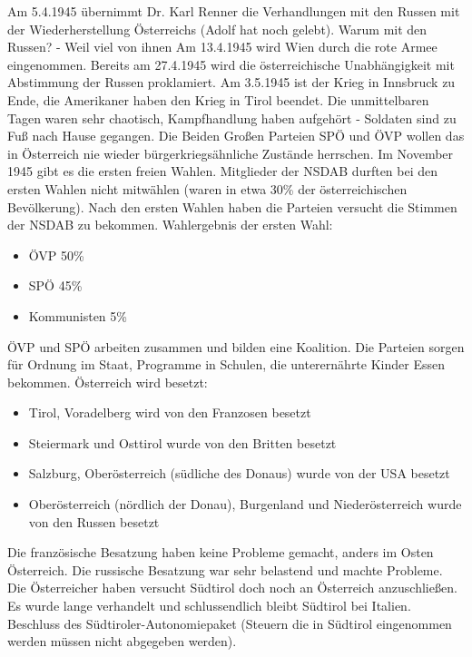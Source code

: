 \documentclass[a4paper,final]{book}
\begin{document}
Am 5.4.1945 übernimmt Dr. Karl Renner die Verhandlungen mit den Russen mit der Wiederherstellung Österreichs (Adolf hat noch gelebt). Warum mit den Russen? - Weil viel von ihnen 
\newline
Am 13.4.1945 wird Wien durch die rote Armee eingenommen. Bereits am 27.4.1945 wird die österreichische Unabhängigkeit mit Abstimmung der Russen proklamiert.
\newline
\newline
Am 3.5.1945 ist der Krieg in Innsbruck zu Ende, die Amerikaner haben den Krieg in Tirol beendet. Die unmittelbaren Tagen waren sehr chaotisch, Kampfhandlung haben aufgehört - Soldaten sind zu Fuß nach Hause gegangen.
\newline
\newline
Die Beiden Großen Parteien SPÖ und ÖVP wollen das in Österreich nie wieder bürgerkriegsähnliche Zustände herrschen.
\newline
\newline
Im November 1945 gibt es die ersten freien Wahlen. Mitglieder der NSDAB durften bei den ersten Wahlen nicht mitwählen (waren in etwa 30\% der österreichischen Bevölkerung). Nach den ersten Wahlen haben die Parteien versucht die Stimmen der NSDAB zu bekommen.
\newline
\newline
Wahlergebnis der ersten Wahl:

\begin{itemize}
\item ÖVP 50\%
\item SPÖ 45\%
\item Kommunisten 5\%
\end{itemize}

ÖVP und SPÖ arbeiten zusammen und bilden eine Koalition. Die Parteien sorgen für Ordnung im Staat, Programme in Schulen, die unterernährte Kinder Essen bekommen.
\newline
\newline
Österreich wird besetzt:

\begin{itemize}
\item Tirol, Voradelberg wird von den Franzosen besetzt
\item Steiermark und Osttirol wurde von den Britten besetzt
\item Salzburg, Oberösterreich (südliche des Donaus) wurde von der USA besetzt
\item Oberösterreich (nördlich der Donau), Burgenland und Niederösterreich wurde von den Russen besetzt
\end{itemize}

Die französische Besatzung haben keine Probleme gemacht, anders im Osten Österreich. Die russische Besatzung war sehr belastend und machte Probleme.
\newline
\newline
Die Österreicher haben versucht Südtirol doch noch an Österreich anzuschließen. Es wurde lange verhandelt und schlussendlich bleibt Südtirol bei Italien.
\newline
Beschluss des Südtiroler-Autonomiepaket (Steuern die in Südtirol eingenommen werden müssen nicht abgegeben werden).
\end{document}
